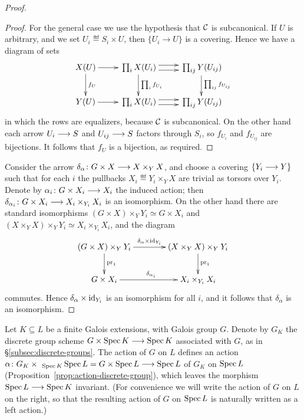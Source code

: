 \begin{4   STACKS}
\begin{4.4 Descent along torsors}
\begin{proof}
\begin{proof}
For the general case we use the hypothesis that $\mathcal{C}$ is subcanonical. If $U$ is arbitrary, and we set $U_i \eqdef S_i \times U$, then $\{U_i \to U\}$ is a covering. Hence we have a diagram of sets
   \[
   \xymatrix{
   X(U)\ar[r]\ar[d]^{f_{U}} &
   {}\prod_{i} X(U_i) \ar[d]^{\prod_i f_{U_i}} \ar@<3pt>[r]\ar@<-3pt>[r] &
   {}\prod_{ij} Y(U_{ij}) \ar[d]^{\prod_{ij} f_{U_{ij}}} \\
   Y(U)\ar[r] & {}\prod_{i} X(U_i) \ar@<3pt>[r]\ar@<-3pt>[r] &
   {}\prod_{ij} Y(U_{ij}) 
   }
   \]
in which the rows are equalizers, because $\mathcal{C}$ is subcanonical. On the other hand each arrow $U_i \arr S$ and $U_{ij} \arr S$ factors through $S_i$, so $f_{U_i}$ and $f_{U_{ij}}$ are bijections. It follows that $f_U$ is a bijection, as required.
\end{proof}


Consider the arrow $\delta_\alpha \colon G \times X \arr X \times_Y X$, and choose a covering $\{Y_i \arr Y\}$ such that for each $i$ the pullbacks $X_i \eqdef Y_i \times_Y X$ are trivial as torsors over $Y_i$. Denote by $\alpha_i \colon G \times X_i \arr X_i$ the induced action; then $\delta_{\alpha_i} \colon G \times X_i \arr X_i \times_{Y_i} X_i$ is an isomorphism. On the other hand there are standard isomorphisms $(G \times X) \times_{Y} Y_i \simeq G \times X_i$ and $(X \times_Y X) \times_Y Y_i \simeq X_i \times_{Y_i} X_i$, and the diagram
   \[
   \xymatrix@C+15pt{
   (G \times X)\times_{Y}Y_i \ar[r]^-{\delta_\alpha\times\id_{Y_i}}
   \ar[d]^{\pr_1} &
   (X \times_Y X)\times_Y Y_i \ar[d]^{\pr_1} \\
   G \times X_i \ar[r]^{\delta_{\alpha_i}} &
   X_i \times_{Y_i} X_i
   }
   \]
commutes. Hence $\delta_\alpha\times\mathrm{id}_{Y_i}$ is an isomorphism for all $i$, and it follows that $\delta_\alpha$ is an isomorphism.
\end{proof}

\begin{example}\label{ex:galois-extensions}
Let $K \subseteq L$ be a finite Galois extensions, with Galois group $G$. Denote by $G_{K}$ the discrete group scheme $G\times \spec K \arr \spec K$ associated with $G$, as in \S\ref{subsec:discrete-groups}. The action of $G$ on $L$ defines an action $\alpha \colon G_{K}\times~_{\spec K} \spec L = G \times \spec L \arr \spec L$ of $G_{K}$ on $\operatorname{Spec} L$ (Proposition~\ref{prop:action-discrete-group}), which leaves the morphism $\spec L \arr \spec K$ invariant. (For convenience we will write the action of $G$ on $L$ on the right, so that the resulting action of $G$ on $\operatorname{Spec} L$ is naturally written as a left action.)


\end{example}
\end{4.4 Descent along torsors}
\end{4   STACKS}
